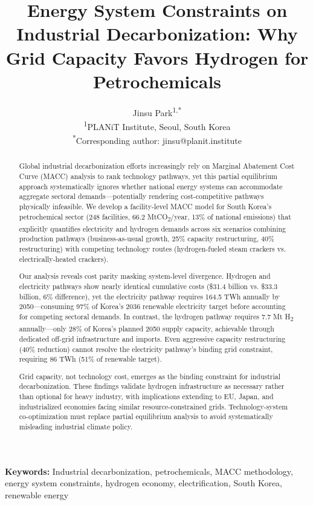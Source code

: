 \documentclass[11pt,a4paper]{article}
\title{Energy System Constraints on Industrial Decarbonization: Why Grid Capacity Favors Hydrogen for Petrochemicals}
\author{
Jinsu Park\textsuperscript{1,*} \\
\small \textsuperscript{1}PLANiT Institute, Seoul, South Korea \\
\small \textsuperscript{*}Corresponding author: jinsu@planit.institute
}
\date{}
\begin{document}
\maketitle

\begin{abstract}
Global industrial decarbonization efforts increasingly rely on Marginal Abatement Cost Curve (MACC) analysis to rank technology pathways, yet this partial equilibrium approach systematically ignores whether national energy systems can accommodate aggregate sectoral demands---potentially rendering cost-competitive pathways physically infeasible. We develop a facility-level MACC model for South Korea's petrochemical sector (248 facilities, 66.2 MtCO\textsubscript{2}/year, 13\% of national emissions) that explicitly quantifies electricity and hydrogen demands across six scenarios combining production pathways (business-as-usual growth, 25\% capacity restructuring, 40\% restructuring) with competing technology routes (hydrogen-fueled steam crackers vs. electrically-heated crackers).

Our analysis reveals cost parity masking system-level divergence. Hydrogen and electricity pathways show nearly identical cumulative costs (\$31.4 billion vs. \$33.3 billion, 6\% difference), yet the electricity pathway requires 164.5 TWh annually by 2050---consuming 97\% of Korea's 2036 renewable electricity target before accounting for competing sectoral demands. In contrast, the hydrogen pathway requires 7.7 Mt H\textsubscript{2} annually---only 28\% of Korea's planned 2050 supply capacity, achievable through dedicated off-grid infrastructure and imports. Even aggressive capacity restructuring (40\% reduction) cannot resolve the electricity pathway's binding grid constraint, requiring 86 TWh (51\% of renewable target).

Grid capacity, not technology cost, emerges as the binding constraint for industrial decarbonization. These findings validate hydrogen infrastructure as necessary rather than optional for heavy industry, with implications extending to EU, Japan, and industrialized economies facing similar resource-constrained grids. Technology-system co-optimization must replace partial equilibrium analysis to avoid systematically misleading industrial climate policy.
\end{abstract}

\noindent \textbf{Keywords:} Industrial decarbonization, petrochemicals, MACC methodology, energy system constraints, hydrogen economy, electrification, South Korea, renewable energy
\end{document}
